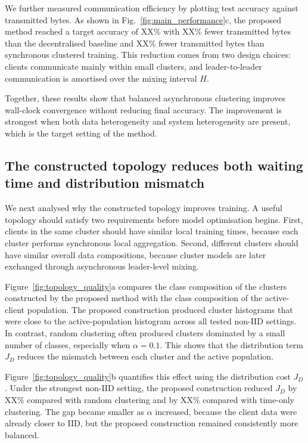 \documentclass[pdflatex,sn-mathphys-num]{sn-jnl}
\begin{document}
We further measured communication efficiency by plotting test accuracy against transmitted bytes. As shown in Fig.~\ref{fig:main_performance}c, the proposed method reached a target accuracy of XX\% with XX\% fewer transmitted bytes than the decentralised baseline and XX\% fewer transmitted bytes than synchronous clustered training. This reduction comes from two design choices: clients communicate mainly within small clusters, and leader-to-leader communication is amortised over the mixing interval \(H\).

Together, these results show that balanced asynchronous clustering improves wall-clock convergence without reducing final accuracy. The improvement is strongest when both data heterogeneity and system heterogeneity are present, which is the target setting of the method.

\subsection{The constructed topology reduces both waiting time and distribution mismatch}
\label{subsec:balanced_topology_results}

We next analysed why the constructed topology improves training. A useful topology should satisfy two requirements before model optimisation begins. First, clients in the same cluster should have similar local training times, because each cluster performs synchronous local aggregation. Second, different clusters should have similar overall data compositions, because cluster models are later exchanged through asynchronous leader-level mixing.

Figure~\ref{fig:topology_quality}a compares the class composition of the clusters constructed by the proposed method with the class composition of the active-client population. The proposed construction produced cluster histograms that were close to the active-population histogram across all tested non-IID settings. In contrast, random clustering often produced clusters dominated by a small number of classes, especially when \(\alpha=0.1\). This shows that the distribution term \(J_D\) reduces the mismatch between each cluster and the active population.

Figure~\ref{fig:topology_quality}b quantifies this effect using the distribution cost \(J_D\). Under the strongest non-IID setting, the proposed construction reduced \(J_D\) by XX\% compared with random clustering and by XX\% compared with time-only clustering. The gap became smaller as \(\alpha\) increased, because the client data were already closer to IID, but the proposed construction remained consistently more balanced.
\end{document}
